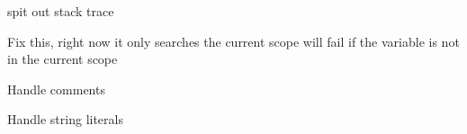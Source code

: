
\begin{DoxyRefList}
\item[Member \mbox{\hyperlink{classylang_1_1ErrorHandler_ad05eb4503a24d358165d2e886e0581a7}{ylang\+::Error\+Handler\+::Handle\+Runtime\+Error}} (const \mbox{\hyperlink{structylang_1_1Error}{Error}} \&error)]\label{todo__todo000001}%
%
spit out stack trace  
\item[Member \mbox{\hyperlink{classylang_1_1Interpreter_aa6829457adb65ad8cd1cd4a0a3922c52}{ylang\+::Interpreter\+::Visit\+Var\+Assign\+Expr}} (\mbox{\hyperlink{classylang_1_1ASTVarAssignExpr}{ASTVar\+Assign\+Expr}} \&expr) override]\label{todo__todo000002}%
%
Fix this, right now it only searches the current scope will fail if the variable is not in the current scope  
\item[Member \mbox{\hyperlink{classylang_1_1Lexer_aba22aa003d6112a56b66e29f3898554d}{ylang\+::Lexer\+::Handle\+Comment}} ()]\label{todo__todo000003}%
%
Handle comments  
\item[Member \mbox{\hyperlink{classylang_1_1Lexer_a26553e15d7a7457e5a8350245783bf3e}{ylang\+::Lexer\+::Handle\+String}} ()]\label{todo__todo000004}%
%
Handle string literals 
\end{DoxyRefList}
